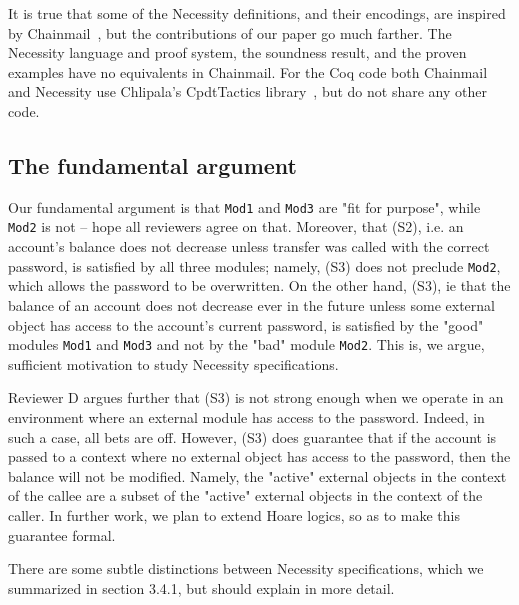 \documentclass[11pt]{amsart}
\newcommand{\prg}[1]{\texttt{#1}}
\begin{document}
It is true that some of the Necessity definitions, and their encodings, are inspired by Chainmail~\citep{Drossopoulou}, 
but the contributions of our paper go much farther.
The Necessity language and proof system, 
the soundness result, and the proven examples have no equivalents in Chainmail.
For the Coq code both Chainmail and Necessity use Chlipala's CpdtTactics library~\citep{Chlipala}, but do not share any other code.

\subsection*{The fundamental argument}

Our fundamental argument is that \prg{Mod1} and \prg{Mod3} are "fit for purpose", while \prg{Mod2} is not -- hope all reviewers agree on that.
Moreover, that (S2), i.e. an account's balance does not decrease unless transfer was called with the correct password, is satisfied by all three modules; namely, (S3) does not preclude \prg{Mod2}, which allows the password to be overwritten. On the other hand, (S3), ie that the balance of an account does not decrease ever in the future unless some external object has access to the account's current password, is satisfied by the "good" modules \prg{Mod1} and \prg{Mod3} and not by the "bad" module \prg{Mod2}. This is, we argue, sufficient motivation to study Necessity specifications. 

Reviewer D argues further that (S3) is not strong enough when we operate in an environment where an external module has access to the password. Indeed, in such a case, all bets are off. However, (S3) does guarantee that if the account is passed to a context where no external object has access to the password, then the balance will not be modified. Namely, the "active" external objects  in the context of the callee are a subset of the "active" external objects  in the context of the caller.  In further work, we plan to extend Hoare logics, so as to make this guarantee formal.

There are some subtle distinctions between Necessity specifications, which we summarized in section 3.4.1, but should explain in more detail. 
\end{document}
